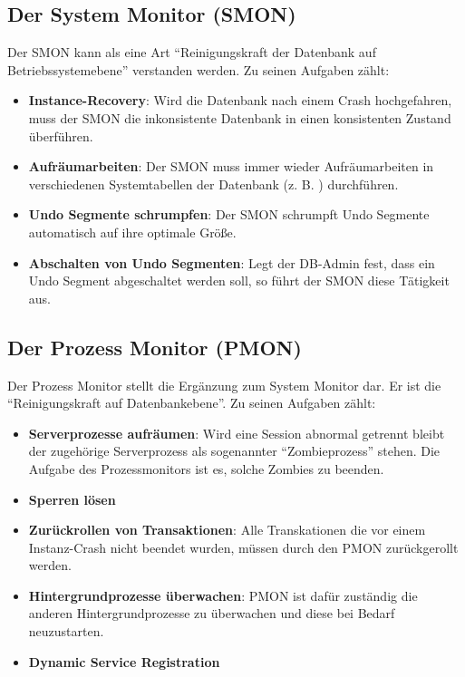             \begin{literaturinternet}
              \item \cite{p665}
            \end{literaturinternet}
        \subsection{Der System Monitor (SMON)}

          Der SMON kann als eine Art \enquote{Reinigungskraft der Datenbank auf Betriebssystemebene} verstanden werden. Zu seinen Aufgaben z\"ahlt:
          \begin{itemize}
            \item \textbf{Instance-Recovery}: Wird die Datenbank nach einem Crash hochgefahren, muss der SMON die inkonsistente Datenbank in einen konsistenten Zustand \"uberf\"uhren.
            \item \textbf{Aufr\"aumarbeiten}: Der SMON muss immer wieder Aufr\"aumarbeiten in verschiedenen Systemtabellen der Datenbank (z. B. ) durchf\"uhren.
            \item \textbf{Undo Segmente schrumpfen}: Der SMON schrumpft Undo Segmente automatisch auf ihre optimale Gr\"o\ss{}e.
            \item \textbf{Abschalten von Undo Segmenten}: Legt der DB-Admin fest, dass ein Undo Segment abgeschaltet werden soll, so f\"uhrt der SMON diese T\"atigkeit aus.
          \end{itemize}
        \subsection{Der Prozess Monitor (PMON)}
          Der Prozess Monitor stellt die Erg\"anzung zum System Monitor dar. Er ist die \enquote{Reinigungskraft auf Datenbankebene}. Zu seinen Aufgaben z\"ahlt:

          \begin{itemize}
            \item \textbf{Serverprozesse aufr\"aumen}: Wird eine Session abnormal getrennt bleibt der zugeh\"orige Serverprozess als sogenannter \enquote{Zombieprozess} stehen. Die Aufgabe des Prozessmonitors ist es, solche Zombies zu beenden.
            \item \textbf{Sperren l\"osen}
            \item \textbf{Zur\"uckrollen von Transaktionen}: Alle Transkationen die vor einem Instanz-Crash nicht beendet wurden, m\"ussen durch den PMON zur\"uckgerollt werden.
            \item \textbf{Hintergrundprozesse \"uberwachen}: PMON ist daf\"ur zust\"andig die anderen Hintergrundprozesse zu \"uberwachen und diese bei Bedarf neuzustarten.
            \item \textbf{Dynamic Service Registration}
          \end{itemize}

